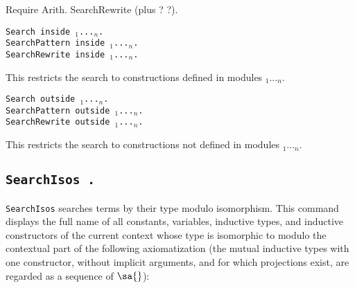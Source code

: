\begin{coq_example}
Require Arith.
SearchRewrite (plus ? ?).
\end{coq_example}

\begin{Variants}
\item
{\tt Search {\qualid} inside
{\module$_1$}...{\module$_n$}.}\\
{\tt SearchPattern {\term} inside
{\module$_1$}...{\module$_n$}.}\\
{\tt SearchRewrite {\term} inside
{\module$_1$}...{\module$_n$}.}

This restricts the search to constructions defined in modules {\module$_1$}...{\module$_n$}.

\item {\tt Search {\qualid} outside {\module$_1$}...{\module$_n$}.}\\
{\tt SearchPattern {\term} outside {\module$_1$}...{\module$_n$}.}\\
{\tt SearchRewrite {\term} outside {\module$_1$}...{\module$_n$}.}

  This restricts the search to constructions not defined in modules
{\module$_1$}...{\module$_n$}.

\end{Variants}

\subsection{\tt SearchIsos {\term}.}
\label{searchisos}
\texttt{SearchIsos} searches terms by their type modulo isomorphism.
This command displays the full name of all constants, variables,
inductive types, and inductive constructors of the current
context whose type is isomorphic to {\term} modulo the contextual part of the
following axiomatization (the mutual inductive types with one constructor,
without implicit arguments, and for which projections exist, are regarded as a
sequence of $\sa{}$):


